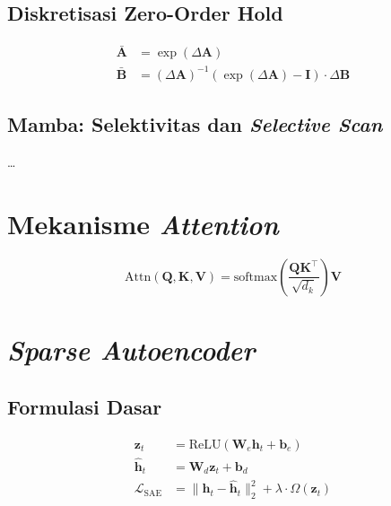 \subsection{Diskretisasi Zero-Order Hold}
\label{subsec:bab3_ssm_diskret}

\begin{align}
\bar{\mathbf{A}} &= \exp(\Delta \mathbf{A}) \\
\bar{\mathbf{B}} &= (\Delta \mathbf{A})^{-1}(\exp(\Delta \mathbf{A}) - \mathbf{I}) \cdot \Delta \mathbf{B}
\label{eq:bab3_zoh}
\end{align}

\subsection{Mamba: Selektivitas dan \emph{Selective Scan}}
\label{subsec:bab3_mamba}

\dots

\section{Mekanisme \emph{Attention}}
\label{subsec:bab3_attn}

\begin{equation}
\text{Attn}(\mathbf{Q},\mathbf{K},\mathbf{V}) = \mathrm{softmax}\!\left(\frac{\mathbf{Q}\mathbf{K}^{\top}}{\sqrt{d_k}}\right)\mathbf{V}
\label{eq:bab3_attn}
\end{equation}

\section{\emph{Sparse Autoencoder}}
\label{subsec:bab3_sae}

\subsection{Formulasi Dasar}
\label{subsec:bab3_sae_basic}

\begin{align}
\mathbf{z}_t &= \text{ReLU}(\mathbf{W}_e \mathbf{h}_t + \mathbf{b}_e) \\
\hat{\mathbf{h}}_t &= \mathbf{W}_d \mathbf{z}_t + \mathbf{b}_d \\
\mathcal{L}_{\text{SAE}} &= \|\mathbf{h}_t - \hat{\mathbf{h}}_t\|_2^2 + \lambda \cdot \Omega(\mathbf{z}_t)
\label{eq:bab3_sae_loss}
\end{align}

